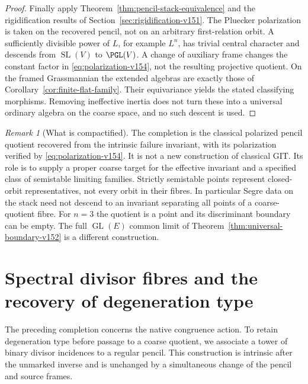 \documentclass[11pt,reqno]{amsart}
\numberwithin{equation}{section}
\theoremstyle{definition}\newtheorem{definition}[theorem]{Definition}
\theoremstyle{remark}\newtheorem{remark}[theorem]{Remark}
\begin{document}
\begin{proof}
Finally apply Theorem~\ref{thm:pencil-stack-equivalence} and the
rigidification results of Section~\ref{sec:rigidification-v151}.
The Pluecker polarization is taken on the recovered pencil, not on
an arbitrary first-relation orbit. A sufficiently divisible power
of $L$, for example $L^n$, has trivial central character and descends
from $\operatorname{SL}(V)$ to $\PGL(V)$. A change of auxiliary frame
changes the constant factor in \eqref{eq:polarization-v154}, not the
resulting projective quotient. On the framed Grassmannian the extended
algebras are exactly those of Corollary~\ref{cor:finite-flat-family}.
Their equivariance yields the stated classifying morphisms. Removing
ineffective inertia does not turn these into a universal ordinary
algebra on the coarse space, and no such descent is used.
\end{proof}

\begin{remark}[What is compactified]\label{rem:git-scope-v154}
The completion is the classical polarized pencil quotient recovered
from the intrinsic failure invariant, with its polarization verified
by \eqref{eq:polarization-v154}. It is not a new construction of
classical GIT. Its role is to supply a proper coarse target for the
effective invariant and a specified class of semistable limiting
families. Strictly semistable points represent closed-orbit
representatives, not every orbit in their fibres. In particular Segre
data on the stack need not descend to an invariant separating all
points of a coarse-quotient fibre. For $n=3$ the quotient is a point
and its discriminant boundary can be empty. The full
$\operatorname{GL}(E)$ common limit of
Theorem~\ref{thm:universal-boundary-v152} is a different construction.
\end{remark}

\section{Spectral divisor fibres and the recovery of degeneration type}
\label{sec:spectral-divisor-v154}
The preceding completion concerns the native congruence action. To
retain degeneration type before passage to a coarse quotient, we
associate a tower of binary divisor incidences to a regular pencil.
This construction is intrinsic after the unmarked inverse and is
unchanged by a simultaneous change of the pencil and source frames.
\end{document}
